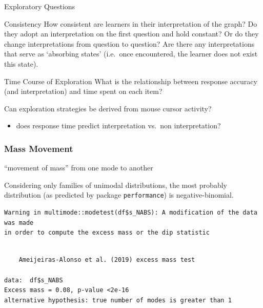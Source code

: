 \documentclass[
  letterpaper,
  DIV=11,
  numbers=noendperiod]{scrreprt}
\newenvironment{Shaded}{\begin{snugshade}}{\end{snugshade}}
\newcommand{\DecValTok}[1]{\textcolor[rgb]{0.68,0.00,0.00}{#1}}
\newcommand{\FunctionTok}[1]{\textcolor[rgb]{0.28,0.35,0.67}{#1}}
\newcommand{\NormalTok}[1]{\textcolor[rgb]{0.00,0.23,0.31}{#1}}
\newcommand{\OtherTok}[1]{\textcolor[rgb]{0.00,0.23,0.31}{#1}}
\newcommand{\SpecialCharTok}[1]{\textcolor[rgb]{0.37,0.37,0.37}{#1}}
\providecommand{\tightlist}{%
  \setlength{\itemsep}{0pt}\setlength{\parskip}{0pt}}\usepackage{longtable,booktabs,array}
\begin{document}
Exploratory Questions

Consistency \textbar{} How consistent are learners in their
interpretation of the graph? Do they adopt an interpretation on the
first question and hold constant? Or do they change interpretations from
question to question? Are there any interpretations that serve as
`absorbing states' (i.e.~once encountered, the learner does not exist
this state).

Time Course of Exploration \textbar{} What is the relationship between
response accuracy (and interpretation) and time spent on each item?

Can exploration strategies be derived from mouse cursor activity?

\begin{itemize}
\tightlist
\item
  does response time predict interpretation vs.~non interpretation?
\end{itemize}

\hypertarget{mass-movement}{%
\subsubsection{Mass Movement}\label{mass-movement}}

``movement of mass'' from one mode to another

Considering only families of unimodal distributions, the most probably
distribution (as predicted by package \texttt{performance}) is
negative-binomial.

\begin{Shaded}
\end{Shaded}

\begin{verbatim}
Warning in multimode::modetest(df$s_NABS): A modification of the data was made
in order to compute the excess mass or the dip statistic
\end{verbatim}

\begin{verbatim}

    Ameijeiras-Alonso et al. (2019) excess mass test

data:  df$s_NABS
Excess mass = 0.08, p-value <2e-16
alternative hypothesis: true number of modes is greater than 1
\end{verbatim}
\end{document}
